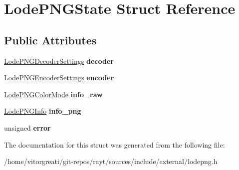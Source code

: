 \hypertarget{struct_lode_p_n_g_state}{}\section{Lode\+P\+N\+G\+State Struct Reference}
\label{struct_lode_p_n_g_state}
\subsection*{Public Attributes}
\begin{DoxyCompactItemize}
\item 
\mbox{\label{struct_lode_p_n_g_state_abd2c38ffc68f04b0e4159e1f97ba1f76}} 
\mbox{\hyperlink{struct_lode_p_n_g_decoder_settings}{Lode\+P\+N\+G\+Decoder\+Settings}} {\bfseries decoder}
\item 
\mbox{\label{struct_lode_p_n_g_state_ac63d91db835129d02eb83bbe81de347e}} 
\mbox{\hyperlink{struct_lode_p_n_g_encoder_settings}{Lode\+P\+N\+G\+Encoder\+Settings}} {\bfseries encoder}
\item 
\mbox{\label{struct_lode_p_n_g_state_a597bc08de787147474d43adf8b6ceacf}} 
\mbox{\hyperlink{struct_lode_p_n_g_color_mode}{Lode\+P\+N\+G\+Color\+Mode}} {\bfseries info\+\_\+raw}
\item 
\mbox{\label{struct_lode_p_n_g_state_a08d9ac43c995fcf34d72b1d37047b6fa}} 
\mbox{\hyperlink{struct_lode_p_n_g_info}{Lode\+P\+N\+G\+Info}} {\bfseries info\+\_\+png}
\item 
\mbox{\label{struct_lode_p_n_g_state_a1a00a050da588cf3c2b7a6252bebb0cd}} 
unsigned {\bfseries error}
\end{DoxyCompactItemize}


The documentation for this struct was generated from the following file\+:\begin{DoxyCompactItemize}
\item 
/home/vitorgreati/git-\/repos/rayt/sources/include/external/lodepng.\+h\end{DoxyCompactItemize}

